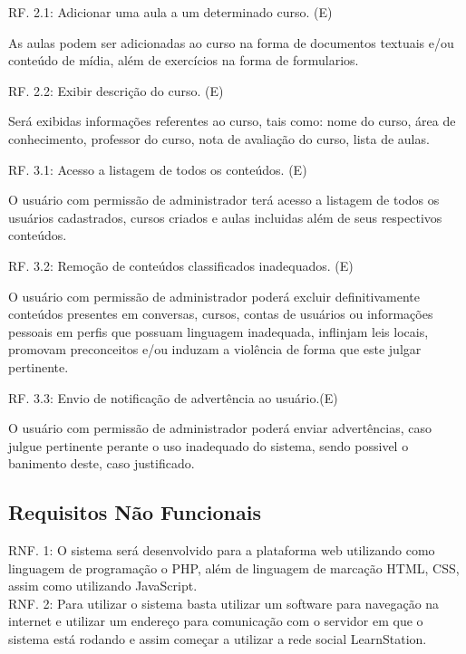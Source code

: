 \documentclass[12pt,a4paper,onecolumn,titlepage]{article}
\begin{document}
\begin{description}
\item RF. 2.1: Adicionar uma aula a um determinado curso. (E)
\item \qquad As aulas podem ser adicionadas ao curso na forma de documentos textuais e/ou conteúdo de mídia, além de exercícios na forma de formularios.

\item RF. 2.2: Exibir descrição do curso. (E)
\item \qquad Será exibidas informações referentes ao curso, tais como: nome do curso, área de conhecimento, professor do curso, nota de avaliação do curso, lista de aulas.

\item RF. 3.1: Acesso a listagem de todos os conteúdos. (E)
\item \qquad O usuário com permissão de administrador terá acesso a listagem de todos os usuários cadastrados, cursos criados e aulas incluidas além de seus respectivos conteúdos.

\item RF. 3.2: Remoção de conteúdos classificados inadequados. (E)
\item \qquad O usuário com permissão de administrador poderá excluir definitivamente conteúdos presentes em conversas, cursos, contas de usuários ou informações pessoais em perfis que possuam linguagem inadequada, inflinjam leis locais, promovam preconceitos e/ou induzam a violência de forma que este julgar pertinente.

\item RF. 3.3: Envio de notificação de advertência ao usuário.(E)
\item \qquad O usuário com permissão de administrador poderá enviar advertências, caso julgue pertinente perante o uso inadequado do sistema, sendo possivel o banimento deste, caso justificado.


\end{description}

\subsection{Requisitos Não Funcionais}

\qquad RNF. 1: O sistema será desenvolvido para a plataforma web utilizando como linguagem de programação o PHP, além de linguagem de marcação HTML, CSS, assim como utilizando JavaScript.\\

RNF. 2: Para utilizar o sistema basta utilizar um software para navegação na internet e utilizar um endereço para comunicação com o servidor em que o sistema está rodando e assim começar a utilizar a rede social LearnStation.\\
\end{document}
